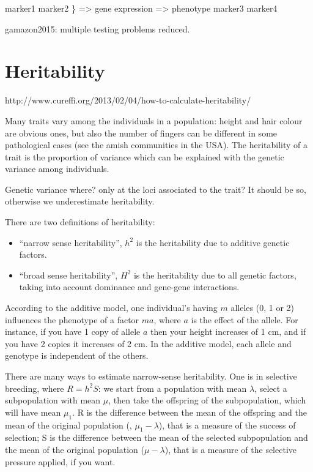 \documentclass[../main.tex]{subfiles}
\begin{document}
marker1
marker2
			\} => gene expression => phenotype
marker3
marker4

gamazon2015: multiple testing problems reduced.

\section{Heritability}

http://www.cureffi.org/2013/02/04/how-to-calculate-heritability/

Many traits vary among the individuals in a population: height and hair 
colour are obvious ones, but also the number of fingers can be different 
in some pathological cases (see the amish communities in the USA). The 
heritability of a trait is the proportion of variance which can be 
explained with the genetic variance among individuals.

Genetic variance where? only at the loci associated to the trait? It 
should be so, otherwise we underestimate heritability.

There are two definitions of heritability:

\begin{itemize}
	\item \enquote{narrow sense heritability}, $h^2$ is the heritability 
		due to additive genetic factors.
	\item \enquote{broad sense heritability}, $H^2$ is the heritability 
		due to all genetic factors, taking into account dominance and 
		gene-gene interactions.
\end{itemize}

According to the additive model, one individual's having $m$ alleles (0, 
1 or 2) influences the phenotype of a factor $m a$, where $a$ is the 
  effect of the allele. For instance, if you have 1 copy of allele $a$ 
  then your height increases of 1 cm, and if you have 2 copies it 
  increases of 2 cm. In the additive model, each allele and genotype is 
  independent of the others.

There are many ways to estimate narrow-sense heritability. One is in 
selective breeding, where $R = h^2 S$: we start from a population with 
mean $\lambda$, select a subpopulation with mean $\mu$, then take the 
offspring of the subpopulation, which will have mean $\mu_1$. R is the 
difference between the mean of the offspring and the mean of the 
original population (\ie, $\mu_1 - \lambda$), that is a measure of the 
success of selection; S is the difference between the mean of the 
selected subpopulation and the mean of the original population (\ie $\mu 
- \lambda$), that is a measure of the selective pressure applied, if you 
want.
\end{document}
